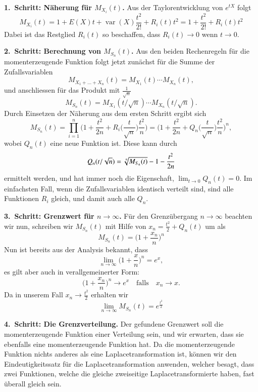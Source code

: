 {\parindent0pt\bf 1.~Schritt: Näherung für $M_{X_i}(t)$.} 
Aus der Taylorentwicklung von $e^{tX}$ folgt
\[
M_{X_i}(t)=1+E(X)t+\operatorname{var}(X)\frac{t^2}{2!}+R_i(t)t^2
=1+\frac{t^2}{2!}+R_i(t)t^2
\]
Dabei ist das Restglied $R_i(t)$ so beschaffen, dass
$R_i(t)\to 0$ wenn $t\to 0$.

\medskip
{\parindent0pt\bf 2.~Schritt: Berechnung von $M_{S_n}(t)$.}
Aus den beiden Rechenregeln für die momenterzeugende Funktion folgt
jetzt zunächst für die Summe der Zufallsvariablen
\[
M_{X_1+\dots+X_n}(t)=M_{X_1}(t)\dotsm M_{X_n}(t),
\]
und anschliessen für das Produkt mit $\frac1{\sqrt{n}}$
\[
M_{S_n}(t)=M_{X_1}(t/\sqrt{n})\dotsm M_{X_n}(t/\sqrt{n}).
\]
Durch Einsetzen der Näherung aus dem ersten Schritt ergibt sich
\[
M_{S_n}(t)
=\prod_{i=1}^n\biggl(1+\frac{t^2}{2n}+R_i\biggl(\frac{t}{\sqrt{n}}\biggl)\frac{t^2}{n}\biggr)
=\biggl(1+\frac{t^2}{2n}+Q_n\biggl(\frac{t}{\sqrt{n}}\biggr)\frac{t^2}{n}\biggr)^n,
\]
wobei $Q_n(t)$ eine neue Funktion ist.
Diese kann durch
\[
Q_n(t/\sqrt{n})=\root{n}\of{M_{S_n}(t)}-1-\frac{t^2}{2n}
\]
ermittelt werden, und hat immer noch die Eigenschaft,
$\lim_{t\to0}Q_n(t)=0$.
Im einfachsten Fall, wenn die Zufallsvariablen
identisch verteilt sind, sind alle Funktionen $R_i$ gleich, und damit
auch alle $Q_n$.

\medskip
{\parindent0pt\bf 3.~Schritt: Grenzwert für $n\to\infty$.}
Für den Grenzübergang $n\to\infty$ beachten wir nun, schreiben wir
$M_{S_n}(t)$ mit Hilfe von
$x_n=\frac{t^2}2+Q_n(t)$
um als
\[
M_{S_n}(t)=\biggl(1+\frac{x_n}n\biggr)^n
\]
Nun ist bereits aus der Analysis bekannt, dass
\[
\lim_{n\to\infty}\biggl(1+\frac{x}{n}\biggr)^n=e^x,
\]
es gilt aber auch in verallgemeinerter Form:
\[
\biggl(1+\frac{x_n}{n}\biggr)^n\to e^x\quad\text{falls}\quad x_n\to x.
\]
Da in unserem Fall $x_n\to \frac{t^2}2$ erhalten wir
\[
\lim_{n\to\infty}M_{S_n}(t)=e^{\frac{t^2}{2}}
\]

\medskip
{\parindent0pt\bf 4.~Schritt: Die Grenzverteilung.}
Der gefundene Grenzwert soll die momenterzeugende Funktion einer
Verteilung sein, und wir erwarten, dass sie ebenfalls eine
momenterzeugende Funktion hat.
Da die momenterzeugende Funktion
nichts anderes als eine Laplacetransformation ist, können wir
den Eindeutigkeitssatz für die Laplacetransformation anwenden,
welcher besagt, dass zwei Funktionen, welche die gleiche zweiseitige
Laplacetransformierte haben, fast überall gleich sein.

